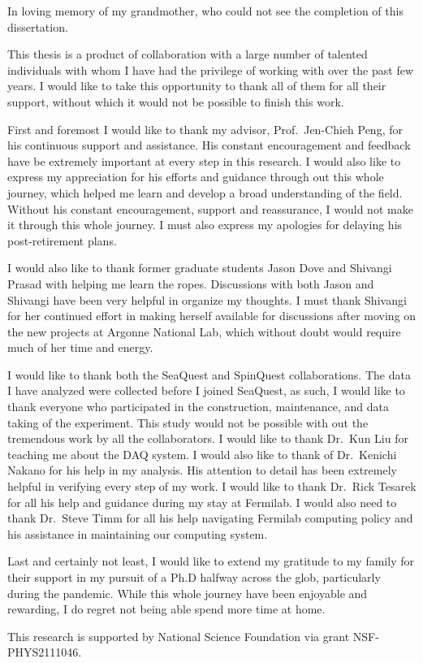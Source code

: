 \documentclass[../main.tex]{subfiles}
\begin{document}
\begin{dedication}
	In loving memory of my grandmother, who could not see the completion of this dissertation.
\end{dedication}

\begin{acknowledgments}
	This thesis is a product of collaboration with a large number of talented
	individuals with whom I have had the privilege of working with over the past
	few years. I would like to take this opportunity to thank all of them for all
	their support, without which it would not be possible to finish this work.

	First and foremost I would like to thank my advisor, Prof.~Jen-Chieh Peng, for
	his continuous support and assistance. His constant encouragement and feedback
	have be extremely important at every step in this research. 
	I would also like to express my	appreciation for his efforts and guidance
	through out this whole journey, which helped me learn and develop a broad
	understanding of the field. 
	Without his constant encouragement, support
	and reassurance, I would not  make it through this whole journey.
	I must also express my apologies for delaying his post-retirement plans.

	I would also like to thank former graduate students Jason Dove and Shivangi
	Prasad with helping me learn the ropes. Discussions with both Jason and
	Shivangi have been very helpful in organize my thoughts.
	I must thank Shivangi for her continued effort in making herself available for 
	discussions after moving on the new projects at Argonne National Lab, which
	without doubt would require much of her time and energy.

	I would like to thank both the SeaQuest and SpinQuest collaborations.
	The data I have analyzed were collected before I joined SeaQuest, as such,
	I would like to thank everyone who participated in the construction, maintenance,
	and data taking of the experiment.
	This study would not be possible with out the tremendous work by all the collaborators. 
	I would like to thank Dr.~Kun Liu for teaching me about the DAQ system.
	I would also like to thank of Dr.~Kenichi Nakano for his help in my analysis.
	His attention to detail has been extremely helpful in verifying every step
	of my work.
	I would like to thank Dr.~Rick Tesarek for all his help and guidance during my
	stay at Fermilab. 
	I would also need to thank Dr.~Steve Timm for all his help navigating Fermilab 
	computing policy and his assistance in maintaining our computing system.
	

	Last and certainly not least, I would like to extend my gratitude to my family
	for their support in my pursuit of a Ph.D halfway across the glob, particularly
	during the pandemic. While this whole journey have been enjoyable and rewarding, 
	I do regret not being able spend more time at home.

	This research is supported by National Science Foundation via grant NSF-PHYS2111046.

\end{acknowledgments}
\end{document}
